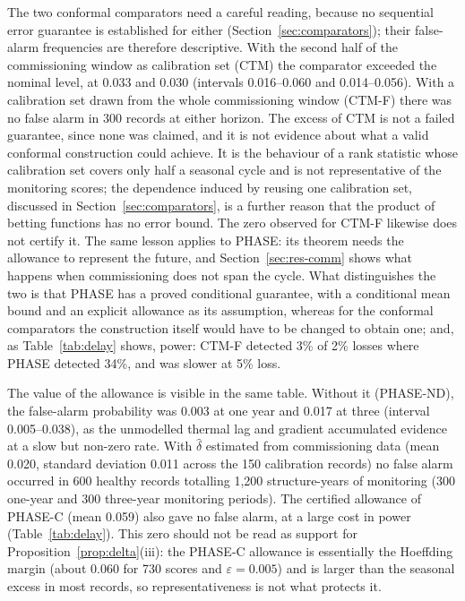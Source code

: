 \documentclass[12pt,a4paper]{article}
\newenvironment{revblock}{}{}
\newenvironment{revblock}{\begingroup\color{revcol}}{\endgroup}
\newcommand{\rtwo}[1]{#1}
\newcommand{\rtwo}[1]{{\color{revcolb}#1}}
\begin{document}
\begin{revblock}
\rtwo{The two conformal comparators need a careful reading, because no sequential error guarantee is established for either (Section~\ref{sec:comparators}); their false-alarm frequencies are therefore descriptive.} \rtwo{With the second half of the commissioning window as calibration set (CTM) the comparator exceeded the nominal level, at 0.033 and 0.030 (intervals 0.016--0.060 and 0.014--0.056).} With a calibration set drawn from the whole commissioning window (CTM-F) there was no false alarm in 300 records at either horizon. \rtwo{The excess of CTM is not a failed guarantee, since none was claimed, and it is not evidence about what a valid conformal construction could achieve.} \rtwo{It is the behaviour of a rank statistic whose calibration set covers only half a seasonal cycle and is not representative of the monitoring scores; the dependence induced by reusing one calibration set, discussed in Section~\ref{sec:comparators}, is a further reason that the product of betting functions has no error bound.} \rtwo{The zero observed for CTM-F likewise does not certify it.} The same lesson applies to PHASE: its theorem needs the allowance to represent the future, and Section~\ref{sec:res-comm} shows what happens when commissioning does not span the cycle. \rtwo{What distinguishes the two is that PHASE has a proved conditional guarantee, with a conditional mean bound and an explicit allowance as its assumption, whereas for the conformal comparators the construction itself would have to be changed to obtain one; and, as Table~\ref{tab:delay} shows, power: CTM-F detected 3\% of 2\% losses where PHASE detected 34\%, and was slower at 5\% loss.}

The value of the allowance is visible in the same table. Without it (PHASE-ND), the false-alarm probability was 0.003 at one year and 0.017 at three (interval 0.005--0.038), as the unmodelled thermal lag and gradient accumulated evidence at a slow but non-zero rate. With $\hat\delta$ estimated from commissioning data (mean 0.020, standard deviation 0.011 across the 150 calibration records) no false alarm occurred in 600 healthy records totalling 1{,}200 structure-years of monitoring (300 one-year and 300 three-year monitoring periods). The certified allowance of PHASE-C (mean 0.059) also gave no false alarm, at a large cost in power (Table~\ref{tab:delay}). This zero should not be read as support for Proposition~\ref{prop:delta}(iii): the PHASE-C allowance is essentially the Hoeffding margin (about 0.060 for 730 scores and $\varepsilon=0.005$) and is larger than the seasonal excess in most records, so representativeness is not what protects it.


\end{revblock}
\end{document}
